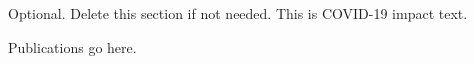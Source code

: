   \renewcommand*{\bibfont}{\large}






\begin{uomcovid} %
  Optional. Delete this section if not needed. This is COVID-19 impact text.
  
\end{uomcovid}%




\makeatletter
\title{\xmp@Title}
\author{\xmp@Author}
\makeatother

\maketitle




\uomtoc %
\uomlof %
\uomlot %
\begin{uomlop} %
  Publications go here.
\end{uomlop}

